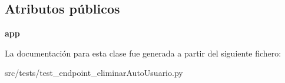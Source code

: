 \subsection*{Atributos públicos}
\begin{DoxyCompactItemize}
\item 
\hypertarget{classsrc_1_1tests_1_1test__endpoint__eliminar_auto_usuario_1_1_test_endpoint_eliminar_auto_usuario_a8c2056fb13bae1273d95a0af7ee02f81}{{\bfseries app}}\label{classsrc_1_1tests_1_1test__endpoint__eliminar_auto_usuario_1_1_test_endpoint_eliminar_auto_usuario_a8c2056fb13bae1273d95a0af7ee02f81}

\end{DoxyCompactItemize}


La documentación para esta clase fue generada a partir del siguiente fichero\-:\begin{DoxyCompactItemize}
\item 
src/tests/test\-\_\-endpoint\-\_\-eliminar\-Auto\-Usuario.\-py\end{DoxyCompactItemize}
